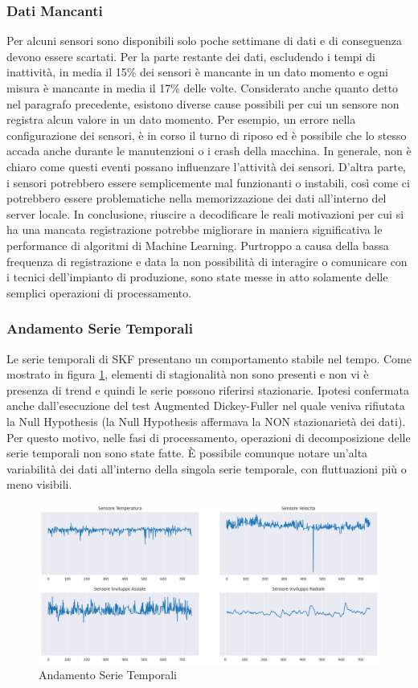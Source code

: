 \subsubsection{Dati Mancanti}
Per alcuni sensori sono disponibili solo poche settimane di dati e di conseguenza devono essere scartati. Per la parte restante dei dati, escludendo i tempi di inattività, in media il 15\% dei sensori è mancante in un dato momento e ogni misura è mancante in media il 17\% delle volte. Considerato anche quanto detto nel paragrafo precedente, esistono diverse cause possibili per cui un sensore non registra alcun valore in un dato momento. Per esempio, un errore nella configurazione dei sensori, è in corso il turno di riposo ed è possibile che lo stesso accada anche durante le manutenzioni o i crash della macchina.
In generale, non è chiaro come questi eventi possano influenzare l'attività dei sensori. D'altra parte, i sensori potrebbero essere semplicemente mal funzionanti o instabili, così come ci potrebbero essere problematiche nella memorizzazione dei dati all'interno del server locale. 
In conclusione, riuscire a decodificare le reali motivazioni per cui si ha una mancata registrazione potrebbe migliorare in maniera significativa le performance di algoritmi di Machine Learning. Purtroppo a causa della bassa frequenza di registrazione e data la non possibilità di interagire o comunicare con i tecnici dell'impianto di produzione, sono state messe in atto solamente delle semplici operazioni di processamento.

\subsubsection{Andamento Serie Temporali}
Le serie temporali di SKF presentano un comportamento stabile nel tempo. Come mostrato in figura \ref{sensors_plot}, elementi di stagionalità non sono presenti e non vi è presenza di trend e quindi le serie possono riferirsi stazionarie. Ipotesi confermata anche dall'esecuzione del test Augmented Dickey-Fuller nel quale veniva rifiutata la Null Hypothesis (la Null Hypothesis affermava la NON stazionarietà dei dati).
Per questo motivo, nelle fasi di processamento, operazioni di decomposizione delle serie temporali non sono state fatte.
È possibile comunque notare un'alta variabilità dei dati all'interno della singola serie temporale, con fluttuazioni più o meno visibili.
\begin{figure}[t]
	\centering
	\includegraphics[width=14cm, scale=1]{images/sensors_plot}
	\caption{Andamento Serie Temporali}
	\label{sensors_plot}
		
\end{figure}

